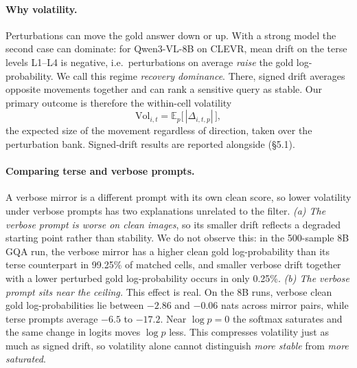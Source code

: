\paragraph{Why volatility.}
Perturbations can move the gold answer down or up. With a strong model
the second case can dominate: for Qwen3-VL-8B on CLEVR, mean drift on the
terse levels L1--L4 is negative, i.e.\ perturbations on average
\emph{raise} the gold log-probability. We call this regime
\emph{recovery dominance}. There, signed drift averages opposite
movements together and can rank a sensitive query as stable. Our
primary outcome is therefore the within-cell volatility
\begin{equation}
  \mathrm{Vol}_{i,t} = \mathbb{E}_p\big[\,|\Delta_{i,t,p}|\,\big],
  \label{eq:vol}
\end{equation}
the expected size of the movement regardless of direction, taken over
the perturbation bank. Signed-drift results are reported alongside
(\S5.1).

\paragraph{Comparing terse and verbose prompts.}
A verbose mirror is a different prompt with its own clean score, so
lower volatility under verbose prompts has two explanations unrelated
to the filter.
\emph{(a) The verbose prompt is worse on clean images}, so its smaller
drift reflects a degraded starting point rather than stability. We do
not observe this: in the 500-sample 8B GQA run, the verbose mirror has a
higher clean gold log-probability than its terse counterpart in
99.25\% of matched cells, and smaller verbose drift together with a
lower perturbed gold log-probability occurs in only 0.25\%.
\emph{(b) The verbose prompt sits near the ceiling.} This effect is
real. On the 8B runs, verbose clean gold log-probabilities lie between
$-2.86$ and $-0.06$ nats across mirror pairs, while terse prompts
average $-6.5$ to $-17.2$. Near $\log p=0$ the softmax saturates and the
same change in logits moves $\log p$ less. This compresses volatility
just as much as signed drift, so volatility alone cannot distinguish
\emph{more stable} from \emph{more saturated}.

